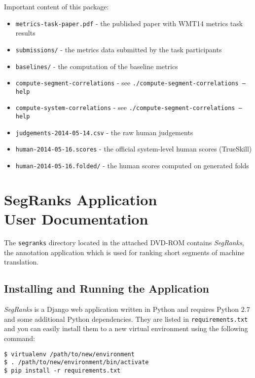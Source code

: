 \noindent Important content of this package:
\begin{itemize}
  \item \texttt{metrics-task-paper.pdf} - the published paper with WMT14 metrics task results
  \item \texttt{submissions/} - the metrics data submitted by the task participants
  \item \texttt{baselines/} - the computation of the baseline metrics
  \item \texttt{compute-segment-correlations} - see \texttt{./compute-segment-correlations --help}
  \item \texttt{compute-system-correlations} - see \texttt{./compute-segment-correlations --help}
  \item \texttt{judgements-2014-05-14.csv} - the raw human judgements
  \item \texttt{human-2014-05-16.scores} - the official system-level human scores (TrueSkill)
  \item \texttt{human-2014-05-16.folded/} - the human scores computed on generated folds
\end{itemize}


\chapter[SegRanks Application User Documentation]{SegRanks Application \\ User Documentation}
\label{segranks-documentation}

The \texttt{segranks} directory located in the attached DVD-ROM contains
\textit{SegRanks}, the annotation application which is used for ranking short
segments of machine translation.

\section{Installing and Running the Application}

\textit{SegRanks} is a Django web application written in Python and requires
Python 2.7 and some additional Python dependencies.  They are listed in
\texttt{requirements.txt} and you can easily install them to a new virtual
environment using the following command:

\begin{verbatim}
$ virtualenv /path/to/new/environment
$ . /path/to/new/environment/bin/activate
$ pip install -r requirements.txt
\end{verbatim}

